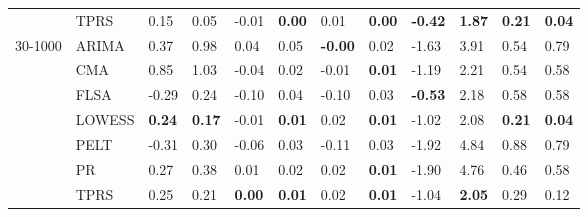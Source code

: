 \begin{table}[ht]
\begin{tabular}{llllllllllll}
   & TPRS & 0.15 & 0.05 & -0.01 & \textbf{0.00} & 0.01 & \textbf{0.00} & \textbf{-0.42} & \textbf{1.87} & \textbf{0.21} & \textbf{0.04} \\ 
  30-1000 & ARIMA & 0.37 & 0.98 & 0.04 & 0.05 & \textbf{-0.00} & 0.02 & -1.63 & 3.91 & 0.54 & 0.79 \\ 
   & CMA & 0.85 & 1.03 & -0.04 & 0.02 & -0.01 & \textbf{0.01} & -1.19 & 2.21 & 0.54 & 0.58 \\ 
   & FLSA & -0.29 & 0.24 & -0.10 & 0.04 & -0.10 & 0.03 & \textbf{-0.53} & 2.18 & 0.58 & 0.58 \\ 
   & LOWESS & \textbf{0.24} & \textbf{0.17} & -0.01 & \textbf{0.01} & 0.02 & \textbf{0.01} & -1.02 & 2.08 & \textbf{0.21} & \textbf{0.04} \\ 
   & PELT & -0.31 & 0.30 & -0.06 & 0.03 & -0.11 & 0.03 & -1.92 & 4.84 & 0.88 & 0.79 \\ 
   & PR & 0.27 & 0.38 & 0.01 & 0.02 & 0.02 & \textbf{0.01} & -1.90 & 4.76 & 0.46 & 0.58 \\ 
   & TPRS & 0.25 & 0.21 & \textbf{0.00} & \textbf{0.01} & 0.02 & \textbf{0.01} & -1.04 & \textbf{2.05} & 0.29 & 0.12 \\ 
   \bottomrule
\end{tabular}
\end{table}
